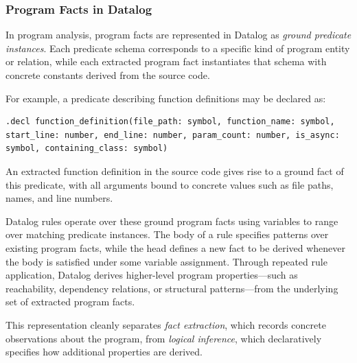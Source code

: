 \subsubsection{Program Facts in Datalog}

In program analysis, program facts are represented in Datalog as \emph{ground predicate instances}. Each predicate schema corresponds to a specific kind of program entity or relation, while each extracted program fact instantiates that schema with concrete constants derived from the source code.

For example, a predicate describing function definitions may be declared as:
\begin{verbatim}
.decl function_definition(file_path: symbol, function_name: symbol, start_line: number, end_line: number, param_count: number, is_async: symbol, containing_class: symbol)
\end{verbatim}

An extracted function definition in the source code gives rise to a ground fact of this predicate, with all arguments bound to concrete values such as file paths, names, and line numbers.

Datalog rules operate over these ground program facts using variables to range over matching predicate instances. The body of a rule specifies patterns over existing program facts, while the head defines a new fact to be derived whenever the body is satisfied under some variable assignment. Through repeated rule application, Datalog derives higher-level program properties—such as reachability, dependency relations, or structural patterns—from the underlying set of extracted program facts.

This representation cleanly separates \emph{fact extraction}, which records concrete observations about the program, from \emph{logical inference}, which declaratively specifies how additional properties are derived.







